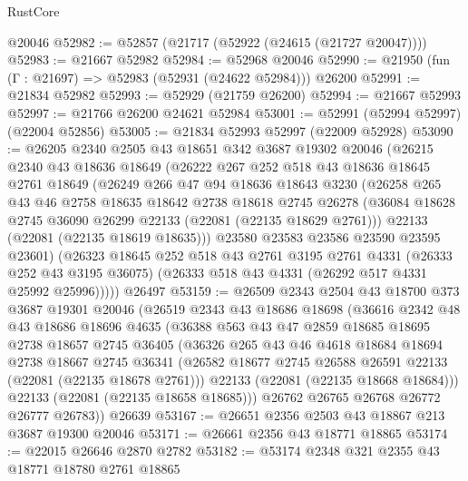 \begin{lexlean}{RustCore}
\begin{coremodule}
    @20046
@52982 := @52857 (@21717 (@52922 (@24615 (@21727 @20047))))
@52983 := @21667 @52982
@52984 := @52968 @20046
@52990 := @21950 (fun (Γ : @21697) => @52983 (@52931 (@24622 @52984))) @26200
@52991 := @21834 @52982
@52993 := @52929 (@21759 @26200)
@52994 := @21667 @52993
@52997 := @21766 @26200 @24621 @52984
@53001 := @52991 (@52994 @52997) (@22004 @52856)
@53005 := @21834 @52993 @52997 (@22009 @52928)
@53090 := @26205
    @2340
    @2505
    @43
    @18651
    @342
    @3687
    @19302
    @20046
    (@26215
      @2340
      @43
      @18636
      @18649
      (@26222
        @267
        @252
        @518
        @43
        @18636
        @18645
        @2761
        @18649
        (@26249
          @266
          @47
          @94
          @18636
          @18643
          @3230
          (@26258
            @265
            @43
            @46
            @2758
            @18635
            @18642
            @2738
            @18618
            @2745
            @26278
            (@36084 @18628 @2745 @36090 @26299 @22133 (@22081 (@22135 @18629 @2761)))
            @22133
            (@22081 (@22135 @18619 @18635)))
          @23580
          @23583
          @23586
          @23590
          @23595
          @23601)
        (@26323
          @18645
          @252
          @518
          @43
          @2761
          @3195
          @2761
          @4331
          (@26333 @252 @43 @3195 @36075)
          (@26333 @518 @43 @4331 (@26292 @517 @4331 @25992 @25996)))))
    @26497
@53159 := @26509
    @2343
    @2504
    @43
    @18700
    @373
    @3687
    @19301
    @20046
    (@26519
      @2343
      @43
      @18686
      @18698
      (@36616
        @2342
        @48
        @43
        @18686
        @18696
        @4635
        (@36388
          @563
          @43
          @47
          @2859
          @18685
          @18695
          @2738
          @18657
          @2745
          @36405
          (@36326
            @265
            @43
            @46
            @4618
            @18684
            @18694
            @2738
            @18667
            @2745
            @36341
            (@26582 @18677 @2745 @26588 @26591 @22133 (@22081 (@22135 @18678 @2761)))
            @22133
            (@22081 (@22135 @18668 @18684)))
          @22133
          (@22081 (@22135 @18658 @18685)))
        @26762
        @26765
        @26768
        @26772
        @26777
        @26783))
    @26639
@53167 := @26651 @2356 @2503 @43 @18867 @213 @3687 @19300 @20046
@53171 := @26661 @2356 @43 @18771 @18865
@53174 := @22015 @26646 @2870 @2782
@53182 := @53174 @2348 @321 @2355 @43 @18771 @18780 @2761 @18865

\end{coremodule}
\end{lexlean}
